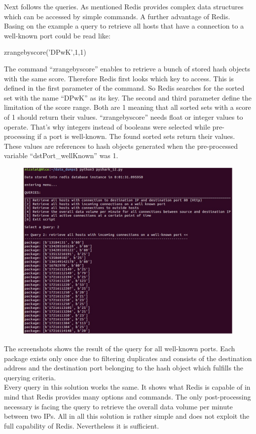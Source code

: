Next follows the queries. As mentioned Redis provides complex data structures which can be accessed by simple commands. A further advantage of Redis. Basing on the example a query to retrieve all hosts that have a connection to a well-known port could be read like:\\

\begin{center}
zrangebyscore('DPwK',1,1)\\
\end{center}

The command “zrangebyscore” enables to retrieve a bunch of stored hash objects with the same score. Therefore Redis first looks which key to access. This is defined in the first parameter of the command. So Redis searches for the sorted set with the name “DPwK” as its key. The second and third parameter define the limitation of the score range. Both are 1 meaning that all sorted sets with a score of 1 should return their values. “zrangebyscore” needs float or integer values to operate. That’s why integers instead of booleans were selected while pre-processing if a port is well-known. The found sorted sets return their values. These values are references to hash objects generated when the pre-processed variable “dstPort_wellKnown” was 1. 

\begin{figure}[h]
	\centerline{\includegraphics[width=1.0\textwidth]{resources/solution3-3.png}}
\end{figure}

The screenshots shows the result of the query for all well-known ports. Each package exists only once due to filtering duplicates and consists of the destination address and the destination port belonging to the hash object which fulfills the querying criteria.\\
Every query in this solution works the same. It shows what Redis is capable of in mind that Redis provides many options and commands. The only post-processing necessary is facing the query to retrieve the overall data volume per minute between two IPs. All in all this solution is rather simple and does not exploit the full capability of Redis. Nevertheless it is sufficient.
